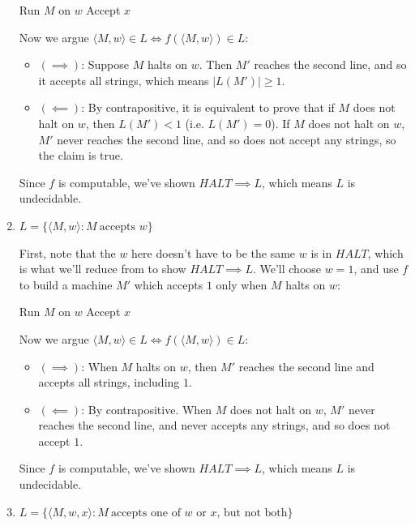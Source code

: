 \documentclass[fleqn]{article}
\begin{document}
\begin{enumerate}
\begin{answer}
        \begin{algorithmic}
                \State Run $M$ on $w$
                \State Accept $x$
            \EndFunction
        \end{algorithmic}
        Now we argue $\langle M, w \rangle \in L \iff f(\langle M, w\rangle) \in L$:
        \begin{itemize}
            \item $(\implies)$: Suppose $M$ halts on $w$. Then $M'$ reaches the second line, and so it accepts all strings, which means $|L(M')| \geq 1$.
            \item $(\impliedby)$: By contrapositive, it is equivalent to prove that if $M$ does not halt on $w$, then $L(M') < 1$ (i.e. $L(M') = 0$). If $M$ does not halt on $w$, $M'$ never reaches the second line, and so does not accept any strings, so the claim is true.
        \end{itemize}
        Since $f$ is computable, we've shown $HALT \implies L$, which means $L$ is undecidable.
    \end{answer}
    \item $L = \{\langle M, w \rangle : M~\text{accepts $w$}\}$
    \begin{answer}
        First, note that the $w$ here doesn't have to be the same $w$ is in $HALT$, which is what we'll reduce from to show $HALT \implies L$. We'll choose $w=1$, and use $f$ to build a machine $M'$ which accepts $1$ only when $M$ halts on $w$:
        \begin{algorithmic}
                \State Run $M$ on $w$
                \State Accept $x$
            \EndFunction
        \end{algorithmic}
        Now we argue $\langle M, w \rangle \in L \iff f(\langle M, w\rangle) \in L$:
        \begin{itemize}
            \item $(\implies)$: When $M$ halts on $w$, then $M'$ reaches the second line and accepts all strings, including $1$.
            \item $(\impliedby)$: By contrapositive. When $M$ does not halt on $w$, $M'$ never reaches the second line, and never accepts any strings, and so does not accept $1$.
        \end{itemize}
        Since $f$ is computable, we've shown $HALT \implies L$, which means $L$ is undecidable.
    \end{answer}
    \item $L = \{\langle M, w, x \rangle : M~\text{accepts one of $w$ or $x$, but not both}\}$

\end{enumerate}
\end{document}
